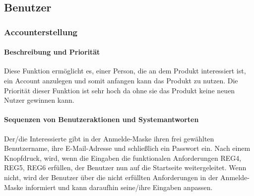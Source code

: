 \subsection{Benutzer}
\subsubsection{Accounterstellung}\label{acc}
\paragraph{Beschreibung und Priorität}
Diese Funktion ermöglicht es, einer Person, die an dem Produkt interessiert ist, ein Account anzulegen und somit anfangen kann das Produkt zu nutzen. Die Priorität dieser Funktion ist sehr hoch da ohne sie das Produkt keine neuen Nutzer gewinnen kann.
\paragraph{Sequenzen von Benutzeraktionen und Systemantworten} Der/die Interessierte gibt in der Anmelde-Maske ihren frei gewählten Benutzername, ihre E-Mail-Adresse und schließlich ein Passwort ein. Nach einem Knopfdruck, wird, wenn die Eingaben die funktionalen Anforderungen REG4, REG5, REG6 erfüllen, der Benutzer nun auf die Startseite weitergeleitet. Wenn nicht, wird der Benutzer über die nicht erfüllten Anforderungen in der Anmelde-Maske informiert und kann daraufhin seine/ihre Eingaben anpassen.
